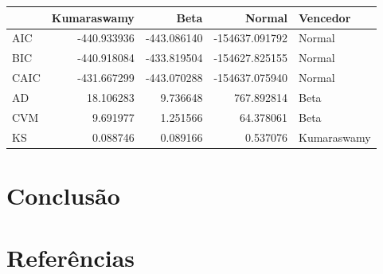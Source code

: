 \documentclass[
]{article}
\begin{document}
\begin{tabular}{lrrrl}
\toprule
{} &  Kumaraswamy &        Beta &         Normal &     Vencedor \\
\midrule
AIC  &  -440.933936 & -443.086140 & -154637.091792 &       Normal \\
BIC  &  -440.918084 & -433.819504 & -154627.825155 &       Normal \\
CAIC &  -431.667299 & -443.070288 & -154637.075940 &       Normal \\
AD   &    18.106283 &    9.736648 &     767.892814 &         Beta \\
CVM  &     9.691977 &    1.251566 &      64.378061 &         Beta \\
KS   &     0.088746 &    0.089166 &       0.537076 &  Kumaraswamy \\
\bottomrule
\end{tabular}

\section{\centering Conclusão}

\section{\centering Referências}
\end{document}
